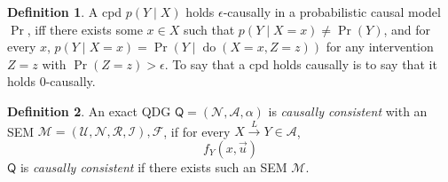 \documentclass{article}
\newcommand{\bp}[1][L]{\mathbf{p}_{\!_#1\!}}
\newcommand{\N}{\mathcal N}
\newcommand{\Ar}{\mathcal A}
\newcommand{\dg}[1]{\mathsf #1}
\newcommand\mat[1]{\mathbf #1}
\theoremstyle{plain}
\theoremstyle{definition}
\newtheorem{defn}{Definition}
\theoremstyle{remark}
\newcommand{\cdo}{\mathop{\mathrm{do}}}
\begin{document}


\begin{defn}
	A cpd $p(Y \mid X)$ holds $\epsilon$-causally in a probabilistic causal model $\Pr$, iff there exists some $x \in X$ such that 
	$p(Y \mid X=x) \neq \Pr(Y)$, and for every $x$,  $p(Y \mid X=x) = \Pr(Y \mid \cdo(X=x,Z=z))$
	for any intervention $Z=z$ with $\Pr(Z = z) > \epsilon$. 
	To say that a cpd holds causally is to say that it holds $0$-causally.	
\end{defn} 






\begin{defn}
	An exact QDG $\dg Q = (\N,\Ar,\alpha)$ is \emph{causally consistent} with an SEM $\mathcal M = (\mathcal U, \N, \mathcal R, \mathcal I), \mathcal F$,%
	if for every $X \overset{L}{\to}Y \in \Ar$, 
	\[ f_Y(x, \vec u) \]
	$\dg Q$ is \emph{causally consistent} if there exists such an SEM $\mathcal M$.%
\end{defn}
\end{document}
